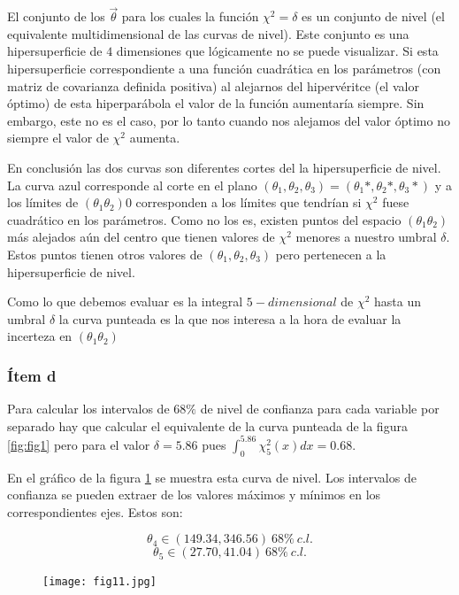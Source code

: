 El conjunto de los $\vec \theta$ para los cuales la función $\chi^2=\delta$ es un conjunto de nivel (el equivalente multidimensional de las curvas de nivel).
Este conjunto es una hipersuperficie de $4$ dimensiones que lógicamente no se puede visualizar.
Si esta hipersuperficie correspondiente a una función cuadrática en los parámetros (con matriz de covarianza definida positiva) al alejarnos del hipervéritce (el valor óptimo) de esta hiperparábola el valor de la función aumentaría siempre.
Sin embargo, este no es el caso, por lo tanto cuando nos alejamos del valor óptimo no siempre el valor de $\chi^2$ aumenta.

En conclusión las dos curvas son diferentes cortes del la hipersuperficie de nivel.
La curva azul corresponde al corte en el plano  $(\theta_1, \theta_2, \theta_3)=(\theta_1*, \theta_2*, \theta_3*)$ y a los límites de $(\theta_1 \theta_2)$0 corresponden a los límites que tendrían si $\chi^2$ fuese cuadrático en los parámetros.
Como no los es, existen puntos del espacio $(\theta_1 \theta_2)$ más alejados aún del centro que tienen valores de $\chi^2$ menores a nuestro umbral $\delta$.
Estos puntos tienen otros valores de $(\theta_1, \theta_2, \theta_3)$ pero pertenecen a la hipersuperficie de nivel.

Como lo que debemos evaluar es la integral $5-dimensional$ de $\chi^2$ hasta un umbral $\delta$ la curva punteada es la que nos interesa a la hora de evaluar la incerteza en $(\theta_1 \theta_2)$

\subsubsection*{Ítem d}
Para calcular los intervalos de $68\%$ de nivel de confianza para cada variable por separado hay que calcular el equivalente de la curva punteada de la figura \ref{fig:fig1} pero para el valor $\delta=5.86$ pues $\int_0^{5.86}\chi^2_5(x)dx=0.68$.

En el gráfico de la figura \ref{fig:fig11} se muestra esta curva de nivel.
Los intervalos de confianza se pueden extraer de los valores máximos y mínimos en los correspondientes ejes.
Estos son:

$$
\theta_4 \in (149.34, 346.56)\ 68\%\ c.l.
$$
$$
\theta_5 \in (27.70, 41.04) \ 68\%\ c.l.
$$

\begin{figure}
\centering
\texttt{[image: fig11.jpg]}
\caption[]{}
\label{fig:fig11}
\end{figure}


